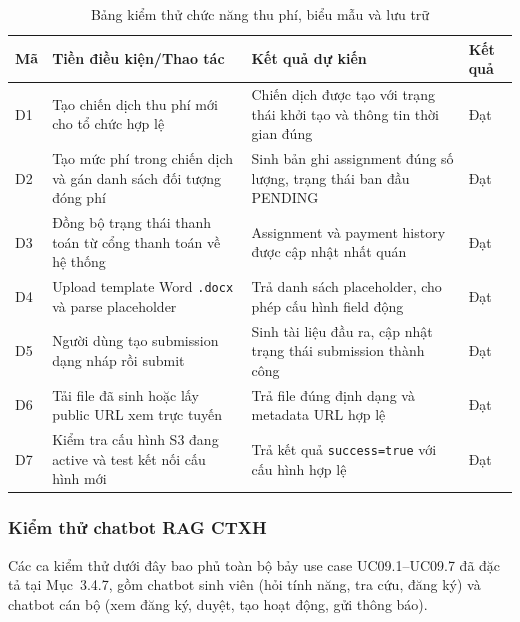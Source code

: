 \begin{table}[H]
\centering
\renewcommand{\arraystretch}{1.2}
\small
\begin{tabular}{|p{2.0cm}|p{4.8cm}|p{4.5cm}|p{3.2cm}|}
\hline
\textbf{Mã} & \textbf{Tiền điều kiện/Thao tác} & \textbf{Kết quả dự kiến} & \textbf{Kết quả} \\
\hline
D1 & Tạo chiến dịch thu phí mới cho tổ chức hợp lệ & Chiến dịch được tạo với trạng thái khởi tạo và thông tin thời gian đúng & Đạt \\
\hline
D2 & Tạo mức phí trong chiến dịch và gán danh sách đối tượng đóng phí & Sinh bản ghi assignment đúng số lượng, trạng thái ban đầu PENDING & Đạt \\
\hline
D3 & Đồng bộ trạng thái thanh toán từ cổng thanh toán về hệ thống & Assignment và payment history được cập nhật nhất quán & Đạt \\
\hline
D4 & Upload template Word \texttt{.docx} và parse placeholder & Trả danh sách placeholder, cho phép cấu hình field động & Đạt \\
\hline
D5 & Người dùng tạo submission dạng nháp rồi submit & Sinh tài liệu đầu ra, cập nhật trạng thái submission thành công & Đạt \\
\hline
D6 & Tải file đã sinh hoặc lấy public URL xem trực tuyến & Trả file đúng định dạng và metadata URL hợp lệ & Đạt \\
\hline
D7 & Kiểm tra cấu hình S3 đang active và test kết nối cấu hình mới & Trả kết quả \texttt{success=true} với cấu hình hợp lệ & Đạt \\
\hline
\end{tabular}
\caption{Bảng kiểm thử chức năng thu phí, biểu mẫu và lưu trữ}
\end{table}

\subsubsection{Kiểm thử chatbot RAG CTXH}
Các ca kiểm thử dưới đây bao phủ toàn bộ bảy use case UC09.1--UC09.7 đã đặc tả tại Mục~3.4.7, gồm chatbot sinh viên (hỏi tính năng, tra cứu, đăng ký) và chatbot cán bộ (xem đăng ký, duyệt, tạo hoạt động, gửi thông báo).

